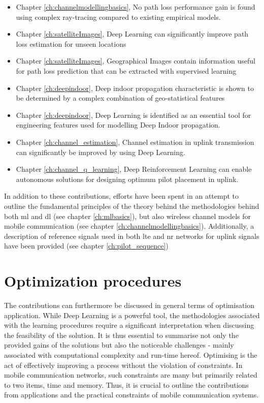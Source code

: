 \begin{itemize}
    \item Chapter \ref{ch:channelmodellingbasics}, No path loss performance gain is found using complex ray-tracing compared to existing empirical models.
    \item Chapter \ref{ch:satelliteImages}, Deep Learning can significantly improve path loss estimation for unseen locations
    \item Chapter \ref{ch:satelliteImages}, Geographical Images contain information useful for path loss prediction that can be extracted with supervised learning
    \item Chapter \ref{ch:deepindoor}, Deep indoor propagation characteristic is shown to be determined by a complex combination of geo-statistical features
    \item Chapter \ref{ch:deepindoor}, Deep Learning is identified as an essential tool for engineering features used for modelling Deep Indoor propagation.
    \item Chapter \ref{ch:channel_estimation}, Channel estimation in uplink transmission can significantly be improved by using Deep Learning.
    \item Chapter \ref{ch:channel_q_learning}, Deep Reinforcement Learning can enable autonomous solutions for designing optimum pilot placement in uplink.
\end{itemize}

In addition to these contributions, efforts have been spent in an attempt to outline the fundamental principles of the theory behind the methodologies behind both \acrfull{ml} and \acrfull{dl} (see chapter \ref{ch:mlbasics}), but also wireless channel models for mobile communication (see chapter \ref{ch:channelmodellingbasics}). Additionally, a description of reference signals used in both \gls{lte} and \gls{nr} networks for uplink signals have been provided (see chapter \ref{ch:pilot_sequence})


\section{Optimization procedures}
The contributions can furthermore be discussed in general terms of optimisation application. While Deep Learning is a powerful tool, the methodologies associated with the learning procedures require a significant interpretation when discussing the feasibility of the solution. It is thus essential to summarise not only the provided gains of the solutions but also the noticeable challenges - mainly associated with computational complexity and run-time hereof. Optimising is the act of effectively improving a process without the violation of constraints. In mobile communication networks, such constraints are many but primarily related to two items, time and memory. Thus, it is crucial to outline the contributions from applications and the practical constraints of mobile communication systems.

